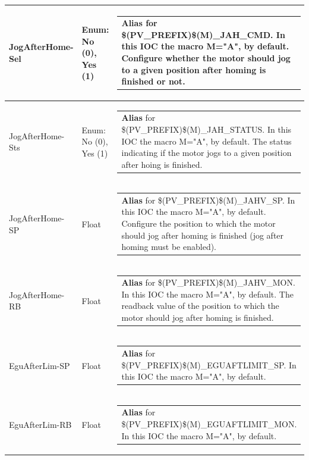 \documentclass[openany]{article}
\begin{document}
\begin{longtable}{| m{4.5cm} m{2.5cm}  m{8.5cm} |}
        JogAfterHome-Sel & Enum: No (0), Yes (1) & \begin{tabular}{@{}m{6cm}@{}}
                \textbf{\color{blue} Alias} for \$(PV\_PREFIX)\$(M)\_JAH\_CMD. In this IOC the macro M="A", by default. Configure whether the motor should jog to a given position after homing is finished or not.
            \end{tabular} \hypertarget{}{}\\ \hline
        JogAfterHome-Sts & Enum: No (0), Yes (1) & \begin{tabular}{@{}m{6cm}@{}}
                \textbf{\color{blue} Alias} for \$(PV\_PREFIX)\$(M)\_JAH\_STATUS. In this IOC the macro M="A", by default. The status indicating if the motor jogs to a given position after hoing is finished.
            \end{tabular} \hypertarget{pv:jog-after-home-sp}{}\\ \hline
        JogAfterHome-SP & Float & \begin{tabular}{@{}m{6cm}@{}}
                \textbf{\color{blue} Alias} for \$(PV\_PREFIX)\$(M)\_JAHV\_SP. In this IOC the macro M="A", by default. Configure the position to which the motor should jog after homing is finished (jog after homing must be enabled).
            \end{tabular} \hypertarget{}{}\\ \hline
        JogAfterHome-RB & Float & \begin{tabular}{@{}m{6cm}@{}}
                \textbf{\color{blue} Alias} for \$(PV\_PREFIX)\$(M)\_JAHV\_MON. In this IOC the macro M="A", by default. The readback value of the position to which the motor should jog after homing is finished.
            \end{tabular} \hypertarget{pv:egu-after-lim}{}\\ \hline
        EguAfterLim-SP & Float & \begin{tabular}{@{}m{6cm}@{}}
                \textbf{\color{blue} Alias} for \$(PV\_PREFIX)\$(M)\_EGUAFTLIMIT\_SP. In this IOC the macro M="A", by default.
            \end{tabular} \hypertarget{}{}\\ \hline
        EguAfterLim-RB & Float & \begin{tabular}{@{}m{6cm}@{}}
                \textbf{\color{blue} Alias} for \$(PV\_PREFIX)\$(M)\_EGUAFTLIMIT\_MON. In this IOC the macro M="A", by default.

\end{tabular}
\end{longtable}
\end{document}
